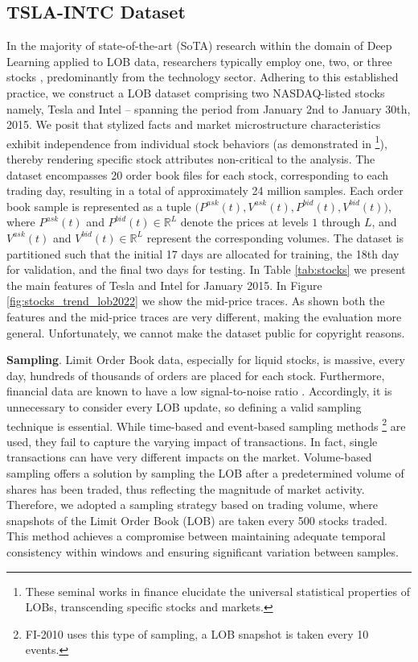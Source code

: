 \subsection{TSLA-INTC Dataset}
In the majority of state-of-the-art (SoTA) research within the domain of Deep Learning applied to LOB data, researchers typically employ one, two, or three stocks \cite{shi2023neural, coletta2021towards, nagy2023generative, li2020generating, shi2022state, hultin2023generative}, predominantly from the technology sector. Adhering to this established practice, we construct a LOB dataset comprising two NASDAQ-listed stocks namely, Tesla and Intel -- spanning the period from January 2nd to January 30th, 2015. We posit that stylized facts and market microstructure characteristics exhibit independence from individual stock behaviors (as demonstrated in \cite{bouchaud2009markets, bouchaud2002statistical, cont2014price, gould2013limit}\footnote{These seminal works in finance elucidate the universal statistical properties of LOBs, transcending specific stocks and markets.}), thereby rendering specific stock attributes non-critical to the analysis. The dataset encompasses 20 order book files for each stock, corresponding to each trading day, resulting in a total of approximately 24 million samples. 
Each order book sample is represented as a tuple $\big(P^{ask}(t), V^{ask}(t), P^{bid}(t), V^{bid}(t)\big)$, where $P^{ask}(t)$ and $P^{bid}(t) \in \mathbb{R}^L$ denote the prices at levels $1$ through $L$, and $V^{ask}(t)$ and $V^{bid}(t) \in \mathbb{R}^L$ represent the corresponding volumes. The dataset is partitioned such that the initial 17 days are allocated for training, the 18th day for validation, and the final two days for testing. In Table \ref{tab:stocks} we present the main features of Tesla and Intel for January 2015. In Figure \ref{fig:stocks_trend_lob2022} we show the mid-price traces. As shown both the features and the mid-price traces are very different, making the evaluation more general. Unfortunately, we cannot make the dataset public for copyright reasons.

\textbf{Sampling}. Limit Order Book data, especially for liquid stocks, is massive, every day, hundreds of thousands of orders are placed for each stock. Furthermore, financial data are known to have a low signal-to-noise ratio \cite{nagel2021machine}. Accordingly, it is unnecessary to consider every LOB update, so defining a valid sampling technique is essential. While time-based and event-based sampling methods \footnote{FI-2010 uses this type of sampling, a LOB snapshot is taken every 10 events.} are used, they fail to capture the varying impact of transactions. In fact, single transactions can have very different impacts on the market. Volume-based sampling offers a solution by sampling the LOB after a predetermined volume of shares has been traded, thus reflecting the magnitude of market activity. Therefore, we adopted a sampling strategy based on trading volume, where snapshots of the Limit Order Book (LOB) are taken every 500 stocks traded. This method achieves a compromise between maintaining adequate temporal consistency within windows and ensuring significant variation between samples.

